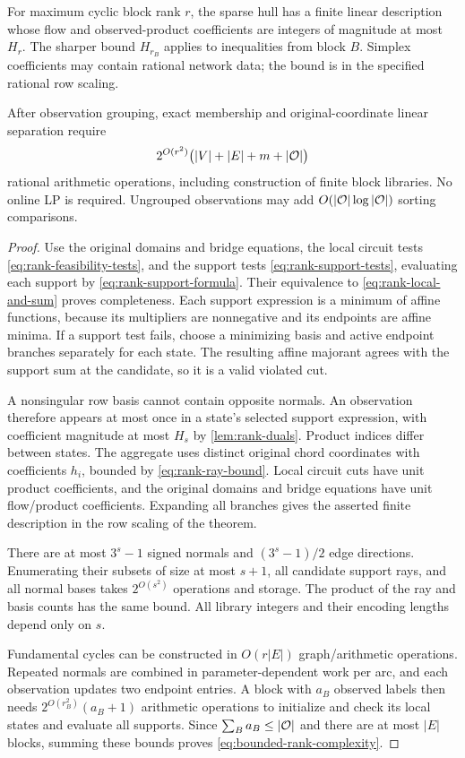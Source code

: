 \begin{theorem}\label{thm:bounded-rank}
For maximum cyclic block rank $r$, the sparse hull has a finite linear
description whose flow and observed-product coefficients are integers
of magnitude at most $H_r$. The sharper bound $H_{r_B}$ applies to
inequalities from block $B$. Simplex coefficients may contain rational
network data; the bound is in the specified rational row scaling.

After observation grouping, exact membership and original-coordinate
linear separation require
\begin{equation}\label{eq:bounded-rank-complexity}
 2^{O(r^2)}\bigl(|V|+|E|+m+|\mathcal O|\bigr)
\end{equation}
rational arithmetic operations, including construction of finite
block libraries. No online LP is required. Ungrouped observations may
add $O(|\mathcal O|\log|\mathcal O|)$ sorting comparisons.
\end{theorem}
\begin{proof}
Use the original domains and bridge equations, the local circuit tests
\eqref{eq:rank-feasibility-tests}, and the support tests
\eqref{eq:rank-support-tests}, evaluating each support by
\eqref{eq:rank-support-formula}. Their equivalence to
\eqref{eq:rank-local-and-sum} proves completeness. Each support expression
is a minimum of affine functions, because its multipliers are nonnegative
and its endpoints are affine minima. If a support test fails, choose
a minimizing basis and active endpoint branches separately for each
state. The resulting affine majorant agrees with the support sum at
the candidate, so it is a valid violated cut.

A nonsingular row basis cannot contain opposite normals. An observation
therefore appears at most once in a state's selected support expression,
with coefficient magnitude at most $H_s$ by
\cref{lem:rank-duals}. Product indices differ between states. The
aggregate uses distinct original chord coordinates with coefficients
$h_i$, bounded by \eqref{eq:rank-ray-bound}. Local circuit cuts have
unit product coefficients, and the original domains and bridge equations
have unit flow/product coefficients. Expanding all branches gives the
asserted finite description in the row scaling of the theorem.

There are at most $3^s-1$ signed normals and $(3^s-1)/2$ edge directions.
Enumerating their subsets of size at most $s+1$, all candidate support
rays, and all normal bases takes $2^{O(s^2)}$ operations and storage.
The product of the ray and basis counts has the same bound. All library
integers and their encoding lengths depend only on $s$.

Fundamental cycles can be constructed in $O(r|E|)$ graph/arithmetic
operations. Repeated normals are combined in parameter-dependent work
per arc, and each observation updates two endpoint entries. A block
with $a_B$ observed labels then needs
$2^{O(r_B^2)}(a_B+1)$ arithmetic operations to initialize and check its
local states and evaluate all supports. Since
$\sum_Ba_B\le|\mathcal O|$ and there are at most $|E|$ blocks, summing
these bounds proves \eqref{eq:bounded-rank-complexity}.
\end{proof}

